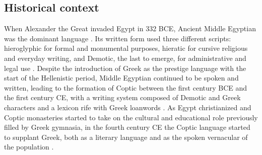 \documentclass[12pt,a4paper]{article}
\begin{document}
\subsection{Historical context}

When Alexander the Great invaded Egypt in 332 BCE, Ancient Middle Egyptian was the dominant language \parencite{riad_egypt_1981, rubenson_transition_1996}. Its written form used three different scripts: hieroglyphic for formal and monumental purposes, hieratic for cursive religious and everyday writing, and Demotic, the last to emerge, for administrative and legal use \parencite{rashwan_ancient_2019}. Despite the introduction of Greek as the prestige language with the start of the Hellenistic period, Middle Egyptian continued to be spoken and written, leading to the formation of Coptic between the first century BCE and the first century CE, with a writing system composed of Demotic and Greek characters and a lexicon rife with Greek loanwords \parencite{takla_coptic_2013}. As Egypt christianized and Coptic monasteries started to take on the cultural and educational role previously filled by Greek gymnasia, in the fourth century CE the Coptic language started to supplant Greek, both as a literary language and as the spoken vernacular of the population \parencite{rubenson_transition_1996}.
\end{document}
